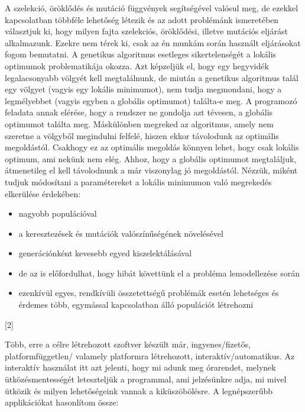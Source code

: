A szelekció, öröklődés és mutáció függvények segítségével valósul meg, de ezekkel
kapcsolatban többféle lehetőség létezik és az adott problémánk ismeretében választjuk ki,
hogy milyen fajta szelekciós, öröklődési, illetve mutációs eljárást alkalmazunk. Ezekre nem
térek ki, csak az én munkám során használt eljárásokat fogom bemutatni.
A genetikus algoritmus esetleges sikertelenségét a lokális optimumok problematikája okozza. 
Azt képzeljük el, hogy egy hegyvidék legalacsonyabb völgyét kell megtalálnunk, de miután a
genetikus algoritmus talál egy völgyet (vagyis egy lokális minimumot), nem tudja megmondani,
hogy a legmélyebbet (vagyis egyben a globális optimumot) találta-e meg. A programozó feladata
annak elérése, hogy a rendszer ne gondolja azt tévesen, a globális optimumot találta meg. 
Máskülönben megreked az algoritmus, amely nem szeretne a völgyből megindulni felfelé, hiszen 
ekkor távolodunk az optimális megoldástól. Csakhogy ez az optimális megoldás könnyen lehet,
hogy csak lokális optimum, ami nekünk nem elég. Ahhoz, hogy a globális optimumot megtaláljuk,
átmenetileg el kell távolodnunk a már viszonylag jó megoldástól. Nézzük, miként tudjuk
módosítani a paramétereket a lokális minimumon való megrekedés elkerülése érdekében:

\begin{itemize}
	\item nagyobb populációval
	\item a keresztezések és mutációk valószínűségének növelésével
	\item generációnként kevesebb egyed kiszelektálásával
	\item de az is előfordulhat, hogy hibát követtünk el a probléma lemodellezése során
	\item ezenkívül egyes, rendkívüli összetettségű problémák esetén lehetséges és érdemes                 több, egymással kapcsolatban álló populációt létrehozni
\end{itemize}
[2]


Több, erre a célre létrehozott szoftver készült már, ingyenes/fizetős, platformfüggetlen/
valamely platformra létrehozott, interaktív/automatikus. Az interaktív használat itt azt
jelenti, hogy mi adunk meg órarendet, melynek ütközésmentességét leteszteljük a programmal,
ami jelzésünkre adja, mi mivel ütközik és milyen lehetőségeink vannak a kiküszöbölésre. 
A legnépszerűbb applikációkat hasonlítom össze:

